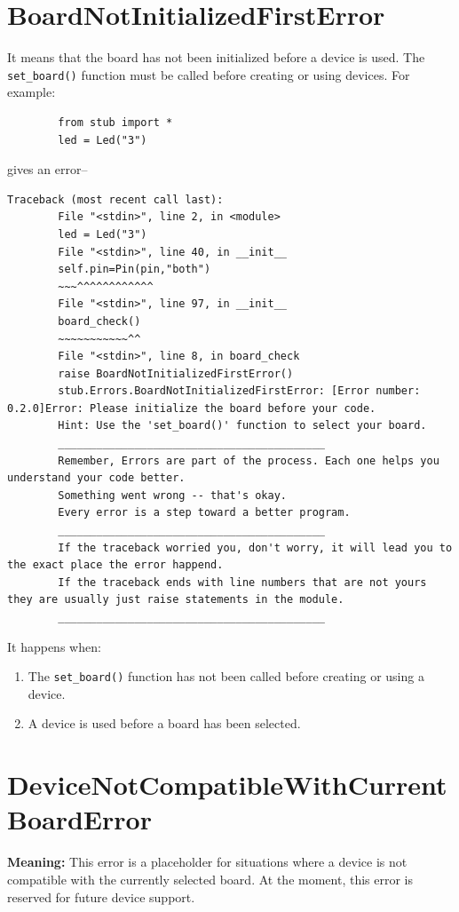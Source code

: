 	\section{BoardNotInitializedFirstError} 
	It means that the board has not been initialized before a device is used. The \texttt{set\_board()} function must be called before creating or using devices. For example: 
	\begin{lstlisting} 
		from stub import * 
		led = Led("3") 
	\end{lstlisting} 
	gives an error-- 
	\begin{lstlisting}[style=tracebacks] 
		Traceback (most recent call last): 
		File "<stdin>", line 2, in <module> 
		led = Led("3") 
		File "<stdin>", line 40, in __init__ 
		self.pin=Pin(pin,"both") 
		~~~^^^^^^^^^^^^ 
		File "<stdin>", line 97, in __init__ 
		board_check() 
		~~~~~~~~~~~^^ 
		File "<stdin>", line 8, in board_check 
		raise BoardNotInitializedFirstError() 
		stub.Errors.BoardNotInitializedFirstError: [Error number: 0.2.0]Error: Please initialize the board before your code. 
		Hint: Use the 'set_board()' function to select your board. 
		__________________________________________ 
		Remember, Errors are part of the process. Each one helps you understand your code better. 
		Something went wrong -- that's okay. 
		Every error is a step toward a better program. 
		__________________________________________ 
		If the traceback worried you, don't worry, it will lead you to the exact place the error happend. 
		If the traceback ends with line numbers that are not yours they are usually just raise statements in the module. 
		__________________________________________ 
	\end{lstlisting} 
	
	It happens when: 
	\begin{enumerate} 
		\item The \texttt{set\_board()} function has not been called before creating or using a device. 
		\item A device is used before a board has been selected. 
	\end{enumerate} 
	\newpage
	\section{DeviceNotCompatibleWithCurrentBoardError}
	
	\textbf{Meaning:} This error is a placeholder for situations where a device is not compatible with the currently selected board. At the moment, this error is reserved for future device support.\\
	
